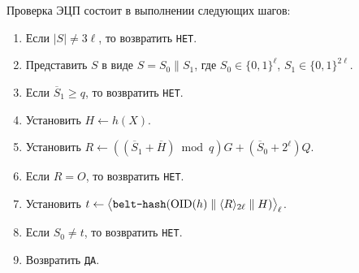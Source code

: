 Проверка ЭЦП состоит в выполнении следующих шагов:
\begin{enumerate}
\item
Если $|S|\neq 3\ell$,
то возвратить \texttt{НЕТ}.

\item
Представить $S$ в виде $S=S_0\parallel S_1$,
где $S_0\in\{0,1\}^{\ell}$, $S_1\in\{0,1\}^{2\ell}$.

\item
Если $\overline{S}_1\geq q$,
то возвратить \texttt{НЕТ}.

\item
Установить $H\leftarrow h(X)$.

\item
Установить
$R\leftarrow \left((\overline{S}_1+\overline{H})\bmod q\right)G+
(\overline{S}_0+2^{\ell})Q$.

\item
Если $R=O$, то возвратить \texttt{НЕТ}.

\item
Установить 
$t\leftarrow\bigl\langle
\texttt{belt-hash}
(\text{\normalfont OID}(h)\parallel\langle R\rangle_{2\ell}\parallel H)
\bigr\rangle_\ell$.

\item
Если $S_0\neq t$,
то возвратить \texttt{НЕТ}.

\item
Возвратить \texttt{ДА}.
\end{enumerate}
